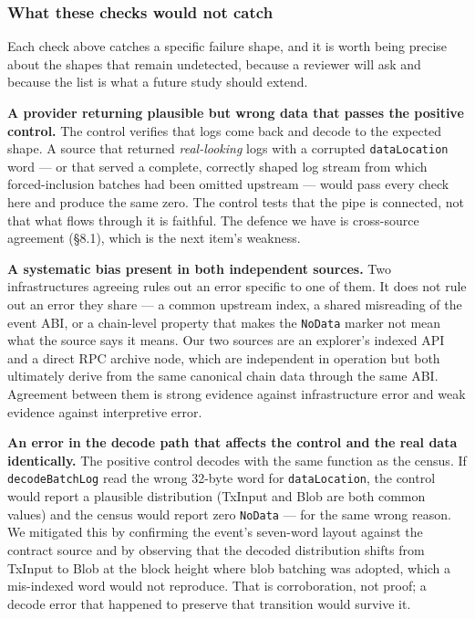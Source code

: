 \documentclass[conference]{IEEEtran}
\renewcommand{\_}{\textunderscore\allowbreak}
\begin{document}
\subsubsection{What these checks would not
catch}\label{what-these-checks-would-not-catch}

Each check above catches a specific failure shape, and it is worth being
precise about the shapes that remain undetected, because a reviewer will
ask and because the list is what a future study should extend.

\textbf{A provider returning plausible but wrong data that passes the
positive control.} The control verifies that logs come back and decode
to the expected shape. A source that returned \emph{real-looking} logs
with a corrupted \texttt{dataLocation} word --- or that served a
complete, correctly shaped log stream from which forced-inclusion
batches had been omitted upstream --- would pass every check here and
produce the same zero. The control tests that the pipe is connected, not
that what flows through it is faithful. The defence we have is
cross-source agreement (§8.1), which is the next item's weakness.

\textbf{A systematic bias present in both independent sources.} Two
infrastructures agreeing rules out an error specific to one of them. It
does not rule out an error they share --- a common upstream index, a
shared misreading of the event ABI, or a chain-level property that makes
the \texttt{NoData} marker not mean what the source says it means. Our
two sources are an explorer's indexed API and a direct RPC archive node,
which are independent in operation but both ultimately derive from the
same canonical chain data through the same ABI. Agreement between them
is strong evidence against infrastructure error and weak evidence
against interpretive error.

\textbf{An error in the decode path that affects the control and the
real data identically.} The positive control decodes with the same
function as the census. If \texttt{decodeBatchLog} read the wrong
32-byte word for \texttt{dataLocation}, the control would report a
plausible distribution (TxInput and Blob are both common values) and the
census would report zero \texttt{NoData} --- for the same wrong reason.
We mitigated this by confirming the event's seven-word layout against
the contract source and by observing that the decoded distribution
shifts from TxInput to Blob at the block height where blob batching was
adopted, which a mis-indexed word would not reproduce. That is
corroboration, not proof; a decode error that happened to preserve that
transition would survive it.
\end{document}

